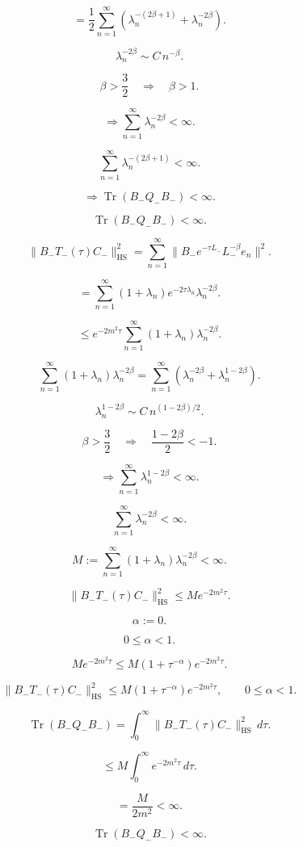 \documentclass[11pt]{article}
\begin{document}
\[
=
\frac12
\sum_{n=1}^{\infty}
\left(
\lambda_n^{-(2\beta+1)}
+
\lambda_n^{-2\beta}
\right).
\]

\[
\lambda_n^{-2\beta}
\sim
C\,n^{-\beta}.
\]

\[
\beta>\frac32
\quad\Longrightarrow\quad
\beta>1.
\]

\[
\Longrightarrow
\sum_{n=1}^{\infty}\lambda_n^{-2\beta}<\infty.
\]

\[
\sum_{n=1}^{\infty}\lambda_n^{-(2\beta+1)}<\infty.
\]

\[
\Longrightarrow
\operatorname{Tr}(B_-Q_-B_-)<\infty.
\]

\[
\boxed{
\operatorname{Tr}(B_-Q_-B_-)<\infty.
}
\]

\[
\|B_-T_-(\tau)C_-\|_{\mathrm{HS}}^2
=
\sum_{n=1}^{\infty}
\|B_-e^{-\tau L_-}L_-^{-\beta}e_n\|^2.
\]

\[
=
\sum_{n=1}^{\infty}
(1+\lambda_n)e^{-2\tau\lambda_n}\lambda_n^{-2\beta}.
\]

\[
\le
e^{-2m^2\tau}
\sum_{n=1}^{\infty}
(1+\lambda_n)\lambda_n^{-2\beta}.
\]

\[
\sum_{n=1}^{\infty}
(1+\lambda_n)\lambda_n^{-2\beta}
=
\sum_{n=1}^{\infty}
\left(
\lambda_n^{-2\beta}
+
\lambda_n^{1-2\beta}
\right).
\]

\[
\lambda_n^{1-2\beta}
\sim
C\,n^{(1-2\beta)/2}.
\]

\[
\beta>\frac32
\quad\Longrightarrow\quad
\frac{1-2\beta}{2}<-1.
\]

\[
\Longrightarrow
\sum_{n=1}^{\infty}
\lambda_n^{1-2\beta}<\infty.
\]

\[
\sum_{n=1}^{\infty}
\lambda_n^{-2\beta}<\infty.
\]

\[
M
:=
\sum_{n=1}^{\infty}
(1+\lambda_n)\lambda_n^{-2\beta}
<\infty.
\]

\[
\boxed{
\|B_-T_-(\tau)C_-\|_{\mathrm{HS}}^2
\le
M e^{-2m^2\tau}.
}
\]

\[
\alpha:=0.
\]

\[
0\le\alpha<1.
\]

\[
M e^{-2m^2\tau}
\le
M(1+\tau^{-\alpha})e^{-2m^2\tau}.
\]

\[
\boxed{
\|B_-T_-(\tau)C_-\|_{\mathrm{HS}}^2
\le
M(1+\tau^{-\alpha})e^{-2m^2\tau},
\qquad
0\le\alpha<1.
}
\]

\[
\operatorname{Tr}(B_-Q_-B_-)
=
\int_0^\infty
\|B_-T_-(\tau)C_-\|_{\mathrm{HS}}^2\,d\tau.
\]

\[
\le
M
\int_0^\infty
e^{-2m^2\tau}\,d\tau.
\]

\[
=
\frac{M}{2m^2}
<\infty.
\]

\[
\boxed{
\operatorname{Tr}(B_-Q_-B_-)<\infty.
}
\]
\end{document}
